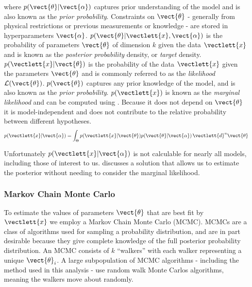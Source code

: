 \noindent where $p(\vect{\theta}|\vect{\alpha})$ captures prior understanding of the
model and is also known as the
\textit{prior probability}.  Constraints on $\vect{\theta}$ - generally from physical restrictions or previous measurements or
knowledge - are stored in hyperparameters $\vect{\alpha}$.  $p(\vect{\theta}|\vectlett{x}, \vect{\alpha})$ is the probability of
parameters $\vect{\theta}$ of dimension $k$ given the
data $\vectlett{x}$ and is known as the \textit{posterior probability} density, or \textit{target}
density.  $p(\vectlett{x}|\vect{\theta})$ is the probability of the data $\vectlett{x}$ given the parameters
$\vect{\theta}$ and is
commonly referred to as the \textit{likelihood} $\mathcal{L}(\vect{\theta})$.  $p(\vect{\theta})$ captures any prior knowledge of the
model, and is also known as the \textit{prior probability}.  $p(\vectlett{x})$ is known as the \textit{marginal likelihood}
and can be computed using .  Because it does not depend on
$\vect{\theta}$ it is model-independent and does not contribute to the relative probability between different
hypotheses.
\begin{equation}
p(\vectlett{x}|\vect{\alpha}) = \int_{\Theta} p(\vectlett{x}|\vect{\theta}) p(\vect{\theta}|\vect{\alpha})\, \vectlett{d}^n \vect{\theta}
\label{eq:er_nr_calibrations_parameter_determ_mc_match_p_data}
\end{equation}

Unfortunately $p(\vectlett{x}|\vect{\alpha})$ is not calculable for nearly all models, including those of interest to
us.   discusses a solution that allows us to estimate the posterior without
needing to consider the marginal likelihood.



\subsubsection{Markov Chain Monte Carlo}
\label{subsubsec:er_nr_calibrations_parameter_determ_mcmc}
To estimate the values of parameters $\vect{\theta}$ that are best fit by $\vectlett{x}$ we employ a Markov Chain
Monte Carlo (MCMC).  MCMCs are a class of algorithms used for sampling a probability distribution, and are in part desirable because they
give complete knowledge of the full posterior probability
distribution.  An MCMC consists of $k$ ``walkers'' with each walker representing a unique $\vect{\theta}_i$.  A large
subpopulation of MCMC algorithms - including the method used in this analysis - use random walk Monte Carlos algorithms, meaning the
walkers move about randomly.

